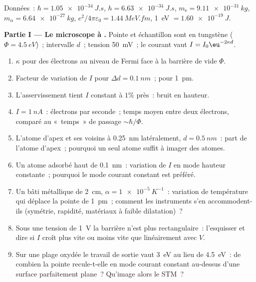 \begin{problem}\label{pb:b2:potential-wells-tunneling:1}
Données~: $\hbar = \qty{1.05e-34}{J.s}$, $h = \qty{6.63e-34}{J.s}$, $m_{\text{e}} =
\qty{9.11e-31}{kg}$, $m_\alpha = \qty{6.64e-27}{kg}$, $e^2/4\pi\varepsilon_0 =
\qty{1.44}{MeV.fm}$, \qty{1}{eV} $= \qty{1.60e-19}{J}$.

\textbf{Partie I --- Le microscope à .}
Pointe et échantillon sont en tungstène ($\Phi = \qty{4.5}{eV}$)~; intervalle $d$~; tension
\qty{50}{mV}~; le courant vaut $I = I_0\eu^{-2\kappa d}$.
\begin{enumerate}
  \item $\kappa$ pour des électrons au niveau de Fermi face à la barrière de
        vide $\Phi$.
  \item Facteur de variation de $I$ pour $\Delta d = \qty{0.1}{nm}$~; pour
        \qty{1}{pm}.
  \item L'asservissement tient $I$ constant à $1\%$ près~: bruit en hauteur.
  \item $I = \qty{1}{nA}$~: électrons par seconde~; temps moyen entre deux
        électrons, comparé au «~temps~» de passage $\sim\hbar/\Phi$.
  \item L'atome d'apex et ses voisins à \qty{0.25}{nm} latéralement,
        $d = \qty{0.5}{nm}$~: part de l'atome d'apex~; pourquoi un seul atome
        suffit à imager des atomes.
  \item Un atome adsorbé haut de \qty{0.1}{nm}~: variation de $I$ en
        mode hauteur constante~; pourquoi le mode courant constant est préféré.
  \item Un bâti métallique de \qty{2}{cm}, $\alpha = \qty{1e-5}{K^{-1}}$~: variation de
        température qui déplace la pointe de \qty{1}{pm}~; comment les instruments
        s'en accommodent-ils (symétrie, rapidité, matériaux à faible dilatation)~?
  \item Sous une tension de \qty{1}{V} la barrière n'est plus rectangulaire~:
        l'esquisser et dire si $I$ croît plus vite ou moins vite que
        linéairement avec $V$.
  \item Sur une plage oxydée le travail de sortie vaut \qty{3}{eV} au lieu
        de \qty{4.5}{eV}~: de combien la pointe recule-t-elle en
        mode courant constant au-dessus d'une surface parfaitement plane~? Qu'image
        alors le STM~?
\end{enumerate}


\end{problem}

